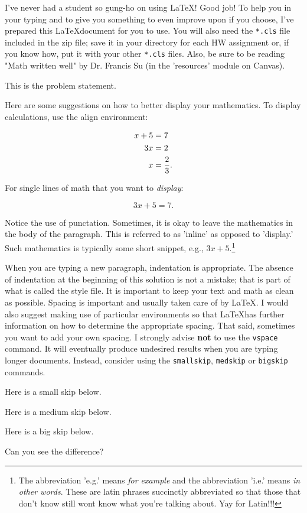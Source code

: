 \documentclass[10pt,letterpaper]{amspset}
\begin{document}

 I've never had a student so gung-ho on using \LaTeX! Good job! To help you in your typing and to give you something to even improve upon if you choose, I've prepared this \LaTeX document for you to use.  You will also need the \texttt{*.cls} file included in the zip file; save it in your directory for each HW assignment or, if you know how, put it with your other \texttt{*.cls} files.  Also, be sure to be reading "Math written well" by Dr. Francis Su (in the 'resources' module on Canvas).

\begin{problem}[1.]
 This is the problem statement.
\end{problem}

\begin{solution}[Solution]

Here are some suggestions on how to better display your mathematics.  To display calculations, use the align environment:

\begin{align}
\notag x+5&=7\\	
3x&=2\\
\notag x&=\frac{2}{3}.
\end{align}

\noindent For single lines of math that you want to \emph{display}:

\[3x+5=7.\]

\noindent Notice the use of punctation.  Sometimes, it is okay to leave the mathematics in the body of the paragraph. This is referred to as 'inline' as opposed to 'display.'  Such mathematics is typically some short snippet, e.g.,  $3x+5$.\footnote{The abbreviation 'e.g.' means \emph{for example} and the abbreviation 'i.e.' means \emph{in other words}. These are latin phrases succinctly abbreviated so that those that don't know still wont know what you're talking about.  Yay for Latin!!!}


When you are typing a new paragraph, indentation is appropriate. The absence of indentation at the beginning of this solution is not a mistake; that is part of what is called the style file.  It is important to keep your text and math as clean as possible.  Spacing is important and usually taken care of by \LaTeX.  I would also suggest making use of particular environments so that \LaTeX has further information on how to determine the appropriate spacing.  That said, sometimes you want to add your own spacing.  I strongly advise \textbf{not} to use the \texttt{vspace} command.  It will eventually produce undesired results when you are typing longer documents.  Instead, consider using the \texttt{smallskip}, \texttt{medskip} or \texttt{bigskip} commands.  

\bigskip
Here is a small skip below.

\smallskip

Here is a medium skip below.

\medskip

Here is a big skip below.

\bigskip
Can you see the difference?

\end{solution}
\end{document}
